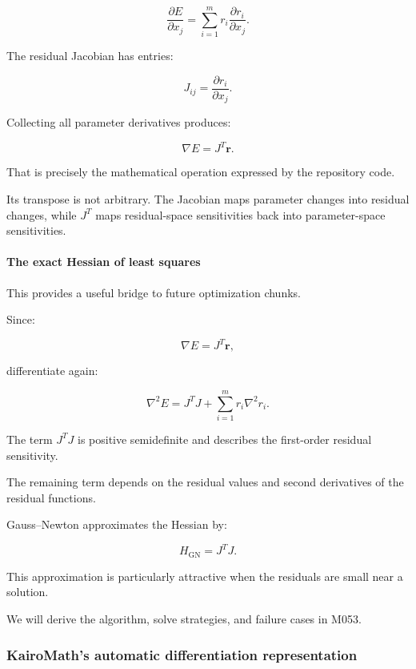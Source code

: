 \[
\frac{\partial E}{\partial x_j} = \sum_{i=1}^m r_i \frac{\partial r_i}{\partial x_j}.
\]

The residual Jacobian has entries:

\[
J_{ij}=\frac{\partial r_i}{\partial x_j}.
\]

Collecting all parameter derivatives produces:

\[
\boxed{ \nabla E=J^T\mathbf r }.
\]

That is precisely the mathematical operation expressed by the repository code.

Its transpose is not arbitrary. The Jacobian maps parameter changes into residual changes, while \(J^T\) maps residual-space sensitivities back into parameter-space sensitivities.

\paragraph{The exact Hessian of least squares}\label{02-foundations-ii-ch021-the-exact-hessian-of-least-squares}

\hypertarget{02-foundations-ii-ch021-the-exact-hessian-of-least-squares}{}

This provides a useful bridge to future optimization chunks.

Since:

\[
\nabla E=J^T\mathbf r,
\]

differentiate again:

\[
\boxed{ \nabla^2E = J^TJ+ \sum_{i=1}^m r_i\nabla^2r_i }.
\]

The term \(J^TJ\) is positive semidefinite and describes the first-order residual sensitivity.

The remaining term depends on the residual values and second derivatives of the residual functions.

Gauss--Newton approximates the Hessian by:

\[
H_{\mathrm{GN}}=J^TJ.
\]

This approximation is particularly attractive when the residuals are small near a solution.

We will derive the algorithm, solve strategies, and failure cases in M053.

\subsubsection{KairoMath's automatic differentiation representation}\label{02-foundations-ii-ch021-kairomaths-automatic-differentiation-representation}

